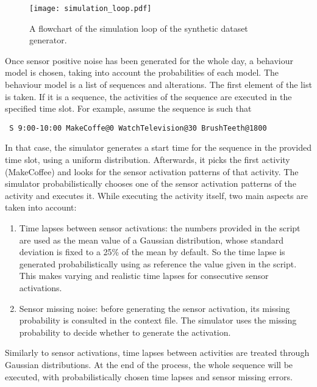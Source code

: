 \begin{figure}[htbp]
\centering
\texttt{[image: simulation\_loop.pdf]}
    \caption{A flowchart of the simulation loop of the synthetic dataset generator.}
    \label{fig-sim-loop}
\end{figure}

Once sensor positive noise has been generated for the whole day, a behaviour model is chosen, taking into account the probabilities of each model. The behaviour model is a list of sequences and alterations. The first element of the list is taken. If it is a sequence, the activities of the sequence are executed in the specified time slot. For example, assume the sequence is such that 

\begin{small}
\begin{lstlisting}
 S 9:00-10:00 MakeCoffe@0 WatchTelevision@30 BrushTeeth@1800 
\end{lstlisting}
\end{small}

\noindent In that case, the simulator generates a start time for the sequence in the provided time slot, using a uniform distribution. Afterwards, it picks the first activity (MakeCoffee) and looks for the sensor activation patterns of that activity. The simulator probabilistically chooses one of the sensor activation patterns of the activity and executes it. While executing the activity itself, two main aspects are taken into account:

\begin{enumerate}
 \item Time lapses between sensor activations: the numbers provided in the script are used as the mean value of a Gaussian distribution, whose standard deviation is fixed to a 25\% of the mean by default. So the time lapse is generated probabilistically using as reference the value given in the script. This makes varying and realistic time lapses for consecutive sensor activations.
 \item Sensor missing noise: before generating the sensor activation, its missing probability is consulted in the context file. The simulator uses the missing probability to decide whether to generate the activation.
\end{enumerate}

Similarly to sensor activations, time lapses between activities are treated through Gaussian distributions. At the end of the process, the whole sequence will be executed, with probabilistically chosen time lapses and sensor missing errors.


